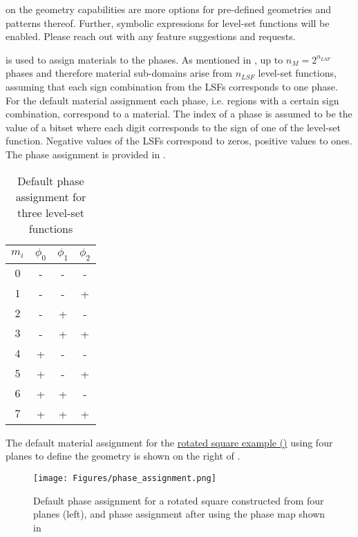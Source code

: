  on the geometry capabilities are more options for pre-defined geometries and patterns thereof. Further, symbolic expressions for level-set functions will be enabled. Please reach out with any feature suggestions and requests.

\newpage

 is used to assign materials to the phases. As mentioned in , up to $n_M = 2^{n_{LSF}}$ phases and therefore material sub-domains arise from $n_{LSF}$ level-set functions, assuming that each sign combination from the LSFs corresponds to one phase. For the default material assignment each phase, i.e. regions with a certain sign combination, correspond to a material. The index of a phase is assumed to be the value of a bitset where each digit corresponds to the sign of one of the level-set function. Negative values of the LSFs correspond to zeros, positive values to ones. The phase assignment is provided in .

\begin{table}[H]
\begin{center}
\begin{tabular}{ c|c c c } 
    $m_i$ & $\phi_0$ & $\phi_1$ & $\phi_2$ \\
    \hline
    $0$ & - & - & - \\ 
    $1$ & - & - & + \\ 
    $2$ & - & + & - \\ 
    $3$ & - & + & + \\ 
    $4$ & + & - & - \\ 
    $5$ & + & - & + \\ 
    $6$ & + & + & - \\ 
    $7$ & + & + & + \\ 
\end{tabular}
\caption{Default phase assignment for three level-set functions}
\label{tab:default_phase_assignment}
\end{center}
\end{table}

The default material assignment for the \href{https://github.com/kkmaute/moris/blob/main/share/doc/mesh_generation/examples/Rotated_Square_Example.xml}{rotated square example (\ExternalLink)} using four planes to define the geometry is shown on the right of . 

\begin{figure}[t]
    \begin{center}
    \texttt{[image: Figures/phase\_assignment.png]}
    \caption{Default phase assignment for a rotated square constructed from four planes (left), and phase assignment after using the phase map shown in } 
    \label{fig:phase_assignment}
    \end{center}
\end{figure}

